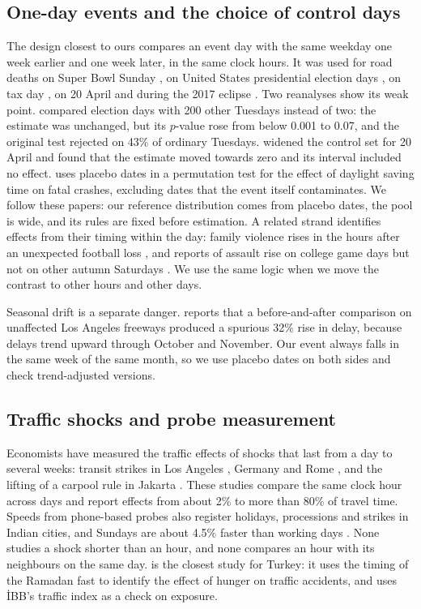 \documentclass[11pt,a4paper]{article}
\begin{document}
\subsection{One-day events and the choice of control days}

The design closest to ours compares an event day with the same weekday one week earlier and one week
later, in the same clock hours. It was used for road deaths on Super Bowl Sunday
\citep{redelmeier2003}, on United States presidential election days \citep{redelmeier2008}, on tax
day \citep{redelmeier2012}, on 20 April \citep{staples2018} and during the 2017 eclipse
\citep{redelmeier2024}. Two reanalyses show its weak point. \citet{zhang2016} compared election
days with 200 other Tuesdays instead of two: the estimate was unchanged, but its $p$-value rose from
below 0.001 to 0.07, and the original test rejected on 43\% of ordinary Tuesdays. \citet{harper2019}
widened the control set for 20 April and found that the estimate moved towards zero and its interval
included no effect. \citet{smith2016} uses placebo dates in a permutation test for the effect of
daylight saving time on fatal crashes, excluding dates that the event itself contaminates. We follow
these papers: our reference distribution comes from placebo dates, the pool is wide, and its rules
are fixed before estimation. A related strand identifies effects from their timing within the day:
family violence rises in the hours after an unexpected football loss \citep{card2011}, and reports of
assault rise on college game days but not on other autumn Saturdays \citep{lindo2018}. We use the
same logic when we move the contrast to other hours and other days.

Seasonal drift is a separate danger. \citet{anderson2014} reports that a before-and-after comparison
on unaffected Los Angeles freeways produced a spurious 32\% rise in delay, because delays trend
upward through October and November. Our event always falls in the same week of the same month, so
we use placebo dates on both sides and check trend-adjusted versions.

\subsection{Traffic shocks and probe measurement}

Economists have measured the traffic effects of shocks that last from a day to several weeks:
transit strikes in Los Angeles \citep{anderson2014}, Germany \citep{bauernschuster2017} and Rome
\citep{adler2021}, and the lifting of a carpool rule in Jakarta \citep{hanna2017}. These studies
compare the same clock hour across days and report effects from about 2\% to more than 80\% of travel
time. Speeds from phone-based probes also register holidays, processions and strikes in Indian cities,
and Sundays are about 4.5\% faster than working days \citep{akbar2023}. None studies a shock shorter than an hour, and none compares an hour with its neighbours on the
same day. \citet{gulek2024} is the closest study for Turkey: it uses the timing of the Ramadan fast
to identify the effect of hunger on traffic accidents, and uses İBB's traffic index as a check on
exposure.
\end{document}

